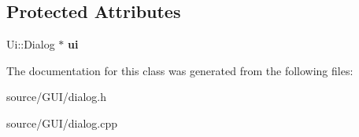 \subsection*{Protected Attributes}
\begin{DoxyCompactItemize}
\item 
Ui\+::\+Dialog $\ast$ {\bfseries ui}\label{class_dialog_aaa4b5bfb9a0f64900d524f14bc32e6df}

\end{DoxyCompactItemize}


The documentation for this class was generated from the following files\+:\begin{DoxyCompactItemize}
\item 
source/\+G\+U\+I/dialog.\+h\item 
source/\+G\+U\+I/dialog.\+cpp\end{DoxyCompactItemize}
